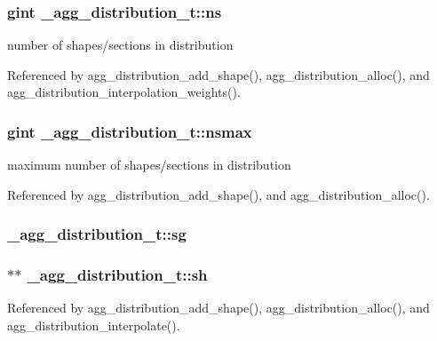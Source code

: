 \subsubsection[{ns}]{\setlength{\rightskip}{0pt plus 5cm}gint \+\_\+agg\+\_\+distribution\+\_\+t\+::ns}\label{struct__agg__distribution__t_a051e68da4c6638f482b2c927acd11699}
number of shapes/sections in distribution 

Referenced by agg\+\_\+distribution\+\_\+add\+\_\+shape(), agg\+\_\+distribution\+\_\+alloc(), and agg\+\_\+distribution\+\_\+interpolation\+\_\+weights().

\subsubsection[{nsmax}]{\setlength{\rightskip}{0pt plus 5cm}gint \+\_\+agg\+\_\+distribution\+\_\+t\+::nsmax}\label{struct__agg__distribution__t_ab8c9bd5cfc25f715d85a6925f86052ef}
maximum number of shapes/sections in distribution 

Referenced by agg\+\_\+distribution\+\_\+add\+\_\+shape(), and agg\+\_\+distribution\+\_\+alloc().

\subsubsection[{sg}]{ \+\_\+agg\+\_\+distribution\+\_\+t\+::sg}\label{struct__agg__distribution__t_a04ffea823dcfe78de05089580c3c578a}
\subsubsection[{sh}]{$\ast$$\ast$ \+\_\+agg\+\_\+distribution\+\_\+t\+::sh}\label{struct__agg__distribution__t_a618c35205d020f68c1b9ff22bd3f030f}


Referenced by agg\+\_\+distribution\+\_\+add\+\_\+shape(), agg\+\_\+distribution\+\_\+alloc(), and agg\+\_\+distribution\+\_\+interpolate().

